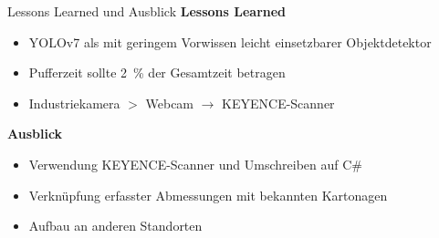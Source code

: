 \documentclass[10pt,ngerman]{beamer}
\begin{document}
\begin{frame}[fragile]{Lessons Learned und Ausblick}
  \textbf{Lessons Learned}
  \begin{itemize}
    \item YOLOv7 als mit geringem Vorwissen leicht einsetzbarer Objektdetektor
          \pause
    \item Pufferzeit sollte \SI{2}{\percent} der Gesamtzeit betragen
          \pause
    \item Industriekamera $>$ Webcam $\rightarrow$ KEYENCE-Scanner
  \end{itemize}

  \pause

  \textbf{Ausblick}
  \begin{itemize}
    \item Verwendung KEYENCE-Scanner und Umschreiben auf C\#
          \pause
    \item Verknüpfung erfasster Abmessungen mit bekannten Kartonagen
          \pause
    \item Aufbau an anderen Standorten
  \end{itemize}
\end{frame}














\end{document}
